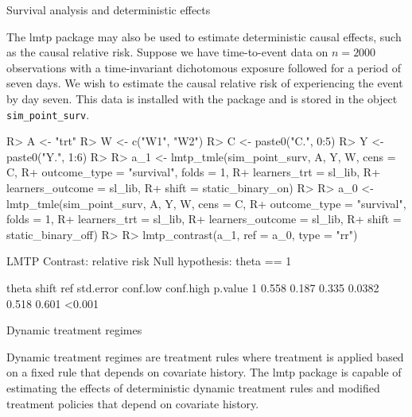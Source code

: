\documentclass[twoside,11pt]{article}
\newenvironment{CodeChunk}{}{}
\newcommand{\pkg}[1]{{\fontseries{b}\selectfont #1}}
\let\code=\texttt
\begin{document}
\hypertarget{example-3-survival-analysis-and-deterministic-effects}{
\begin{example}{Survival analysis and deterministic effects}
\end{example}}

The \pkg{lmtp} package may also be used to estimate deterministic causal effects, such as the causal relative risk. Suppose we have time-to-event data on \(n = 2000\) observations with a time-invariant dichotomous exposure followed for a period of seven days. We wish to estimate the causal relative risk of experiencing the event by day seven. This data is installed with the package and is stored in the object \code{sim\_point\_surv}. 

\begin{CodeChunk}
\begin{CodeInput}
R> A <- "trt"
R> W <- c("W1", "W2")
R> C <- paste0("C.", 0:5)
R> Y <- paste0("Y.", 1:6)
R>
R> a_1 <- lmtp_tmle(sim_point_surv, A, Y, W, cens = C,
R+                  outcome_type = "survival", folds = 1,
R+                  learners_trt = sl_lib,
R+                  learners_outcome = sl_lib,
R+                  shift = static_binary_on)
R> 
R> a_0 <- lmtp_tmle(sim_point_surv, A, Y, W, cens = C,
R+                  outcome_type = "survival", folds = 1,
R+                  learners_trt = sl_lib,
R+                  learners_outcome = sl_lib,
R+                  shift = static_binary_off)
R>                  
R> lmtp_contrast(a_1, ref = a_0, type = "rr")
\end{CodeInput}

\begin{CodeOutput}
  LMTP Contrast: relative risk
Null hypothesis: theta == 1

  theta shift   ref std.error conf.low conf.high p.value
1 0.558 0.187 0.335    0.0382    0.518     0.601  <0.001
\end{CodeOutput}
\end{CodeChunk}

\hypertarget{example-4-dynamic-treatment-regimes}{
\begin{example}{Dynamic treatment regimes}
\end{example}}

Dynamic treatment regimes are treatment rules where treatment is applied based on a fixed rule that depends on covariate history. The \pkg{lmtp} package is capable of estimating the effects of deterministic dynamic treatment rules and modified treatment policies that depend on covariate history. 
\end{document}
